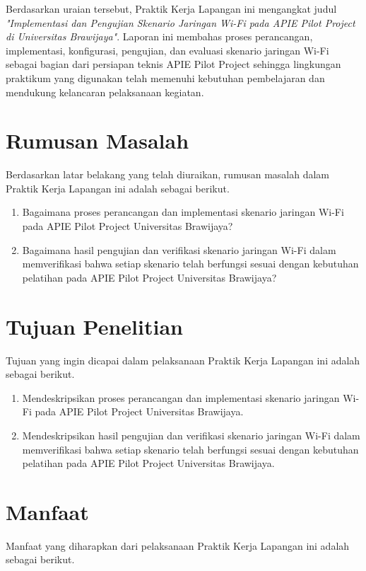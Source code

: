 Berdasarkan uraian tersebut, Praktik Kerja Lapangan ini mengangkat judul \textit{"Implementasi dan Pengujian Skenario Jaringan Wi-Fi pada APIE Pilot Project di Universitas Brawijaya"}. Laporan ini membahas proses perancangan, implementasi, konfigurasi, pengujian, dan evaluasi skenario jaringan Wi-Fi sebagai bagian dari persiapan teknis APIE Pilot Project sehingga lingkungan praktikum yang digunakan telah memenuhi kebutuhan pembelajaran dan mendukung kelancaran pelaksanaan kegiatan.

\section{Rumusan Masalah}

Berdasarkan latar belakang yang telah diuraikan, rumusan masalah dalam Praktik Kerja 
Lapangan ini adalah sebagai berikut.

\begin{enumerate}[nosep]
\item Bagaimana proses perancangan dan implementasi skenario jaringan Wi-Fi pada APIE Pilot Project Universitas Brawijaya?
\item Bagaimana hasil pengujian dan verifikasi skenario jaringan Wi-Fi dalam memverifikasi bahwa setiap skenario telah berfungsi sesuai dengan kebutuhan pelatihan pada APIE Pilot Project Universitas Brawijaya?
\end{enumerate}


\section{Tujuan Penelitian}

Tujuan yang ingin dicapai dalam pelaksanaan Praktik Kerja Lapangan ini adalah sebagai berikut.

\begin{enumerate}[nosep]
\item Mendeskripsikan proses perancangan dan implementasi skenario jaringan Wi-Fi pada APIE Pilot Project Universitas Brawijaya.
\item Mendeskripsikan hasil pengujian dan verifikasi skenario jaringan Wi-Fi dalam memverifikasi bahwa setiap skenario telah berfungsi sesuai dengan kebutuhan pelatihan pada APIE Pilot Project Universitas Brawijaya.
\end{enumerate}

\section{Manfaat}
Manfaat yang diharapkan dari pelaksanaan Praktik Kerja Lapangan ini adalah sebagai berikut.


